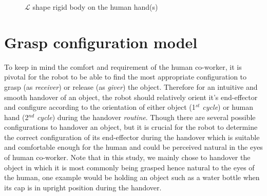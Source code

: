 \begin{figure}[htpb]
	\caption{$\mathcal{L}$ shape rigid body on the human hand(s)}
	\label{fig:lshapes}
\end{figure}

\clearpage

\section{Grasp configuration model}\label{hand_orientation}

To keep in mind the comfort and requirement of the human co-worker, it is pivotal for the robot to be able to find the most appropriate configuration to grasp (as \textit{receiver}) or release (as \textit{giver}) the object. Therefore for an intuitive and smooth handover of an object, the robot should relatively orient it's end-effector and configure according to the orientation of either object (1$^{st}$ \textit{cycle}) or human hand (2$^{nd}$ \textit{cycle}) during the handover \textit{routine}. Though there are several possible configurations to handover an object, but it is crucial for the robot to determine the correct configuration of its end-effector during the handover which is suitable and comfortable enough for the human and could be perceived natural in the eyes of human co-worker. Note that in this study, we mainly chose to handover the object in which it is most commonly being grasped hence natural to the eyes of the human, one example would be holding an object such as a water bottle when its cap is in upright position during the handover. 


